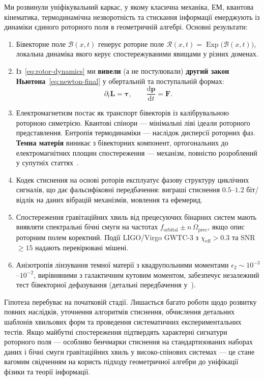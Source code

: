 \documentclass[11pt,a4paper]{article}
\newcommand{\Exp}{\operatorname{Exp}}
\newcommand{\Rotor}{\mathcal{R}}
\newcommand{\Biv}{\mathcal{B}}
\theoremstyle{definition}
\theoremstyle{plain}
\theoremstyle{remark}
\begin{document}
Ми розвинули уніфікувальний каркас, у якому класична механіка, ЕМ, квантова кінематика, термодинамічна незворотність та стискання інформації емерджують із динаміки єдиного роторного поля в геометричній алгебрі. Основні результати:

\begin{enumerate}
  \item Бівекторне поле $\Biv(x,t)$ генерує роторне поле $\Rotor(x,t)=\Exp\!\big(\Biv(x,t)\big)$, локальна динаміка якого керує спостережуваними явищами у різних доменах.
  \item Із~\eqref{eq:rotor-dynamics} ми \textbf{вивели} (а не постулювали) \textbf{другий закон Ньютона}~\eqref{eq:newton-final} у обертальній та поступальній формах:
  \begin{equation*}
  \partial_t \bm{L} = \bm{\tau}, \qquad \frac{\mathrm{d}\mathbf{p}}{\mathrm{d}t} = \mathbf{F}.
  \end{equation*}
  \item Електромагнетизм постає як транспорт бівекторів із калібрувальною роторною симетрією. Квантові спінори — мінімальні ліві ідеали роторного представлення. Ентропія термодинаміки — наслідок дисперсії роторних фаз. \textbf{Темна матерія} виникає з бівекторних компонент, ортогональних до електромагнітних площин спостереження — механізм, повністю розроблений у супутніх статтях~\cite{DarkMatterPaper}.
  \item Кодек стиснення на основі роторів експлуатує фазову структуру циклічних сигналів, що дає фальсифіковні передбачення: виграші стиснення $0.5$–$1.2$ біт/відлік на даних вібрацій механізмів, мовлення та ефемерид.
  \item Спостереження гравітаційних хвиль від прецесуючих бінарних систем мають виявляти спектральні бічні смуги на частотах $f_{\text{orbital}} \pm n\,\Omega_{\text{prec}}$, якщо опис роторним полем коректний. Події LIGO/Virgo GWTC-3 з $\chi_{\text{eff}} > 0.3$ та SNR $\ge 15$ надають перевірювані мішені.
  \item Анізотропія лінзування темної матерії з квадрупольними моментами $\epsilon_2 \sim 10^{-3}$--$10^{-2}$, вирівняними з галактичним кутовим моментом, забезпечує незалежний тест бівекторної дефазування (детальні передбачення у~\cite{DarkMatterPaper}).
\end{enumerate}

Гіпотеза перебуває на початковій стадії. Лишається багато роботи щодо розвитку повних наслідків, уточнення алгоритмів стиснення, обчислення детальних шаблонів хвильових форм та проведення систематичних експериментальних тестів. Якщо майбутні спостереження підтвердять характерні сигнатури роторного поля — особливо бенчмарки стиснення на стандартизованих наборах даних і бічні смуги гравітаційних хвиль у високо-спінових системах — це стане вагомим свідченням на користь підходу геометричної алгебри до уніфікації фізики та теорії інформації.
\end{document}
